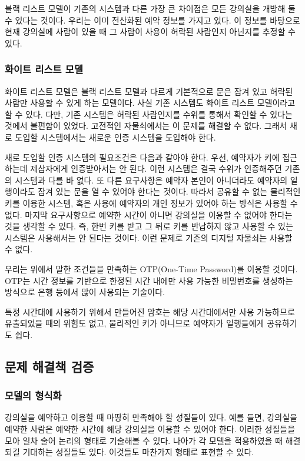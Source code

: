\documentclass[11pt,a4paper]{article}
\begin{document}
블랙 리스트 모델이 기존의 시스템과 다른 가장 큰 차이점은 모든 강의실을 개방해
둘 수 있다는 것이다. 우리는 이미 전산화된 예약 정보를 가지고 있다. 이 정보를
바탕으로 현재 강의실에 사람이 있을 때 그 사람이 사용이 허락된 사람인지 아닌지를
추정할 수 있다.

\subsubsection{화이트 리스트 모델}
화이트 리스트 모델은 블랙 리스트 모델과 다르게 기본적으로 문은 잠겨 있고 허락된
사람만 사용할 수 있게 하는 모델이다. 사실 기존 시스템도 화이트 리스트
모델이라고 할 수 있다. 다만, 기존 시스템은 허락된 사람인지를 수위를 통해서
확인할 수 있다는 것에서 불편함이 있었다. 고전적인 자물쇠에서는 이 문제를 해결할
수 없다. 그래서 새로 도입할 시스템에서는 새로운 인증 시스템을 도입해야 한다.

새로 도입할 인증 시스템의 필요조건은 다음과 같아야 한다. 우선, 예약자가 키에
접근하는데 제삼자에게 인증받아서는 안 된다. 이런 시스템은 결국 수위가
인증해주던 기존의 시스템과 다를 바 없다. 또 다른 요구사항은 예약자 본인이
아니더라도 예약자의 일행이라도 잠겨 있는 문을 열 수 있어야 한다는 것이다.
따라서 공유할 수 없는 물리적인 키를 이용한 시스템, 혹은 사용에 예약자의 개인
정보가 있어야 하는 방식은 사용할 수 없다. 마지막 요구사항으로 예약한 시간이
아니면 강의실을 이용할 수 없어야 한다는 것을 생각할 수 있다. 즉, 한번 키를 받고
그 뒤로 키를 반납하지 않고 사용할 수 있는 시스템은 사용해서는 안 된다는 것이다.
이런 문제로 기존의 디지털 자물쇠는 사용할 수 없다.

우리는 위에서 말한 조건들을 만족하는 OTP(One-Time Password)를 이용할 것이다.
OTP는 시간 정보를 기반으로 한정된 시간 내에만 사용 가능한 비밀번호를 생성하는
방식으로 은행 등에서 많이 사용되는 기술이다.

특정 시간대에 사용하기 위해서 만들어진 암호는 해당 시간대에서만 사용 가능하므로
유출되었을 때의 위험도 없고, 물리적인 키가 아니므로 예약자가 일행들에게
공유하기도 쉽다.

\subsection{문제 해결책 검증}

\subsubsection{모델의 형식화}
강의실을 예약하고 이용할 때 마땅히 만족해야 할 성질들이 있다. 예를 들면,
강의실을 예약한 사람은 예약한 시간에 해당 강의실을 이용할 수 있어야 한다.
이러한 성질들을 모아 일차 술어 논리의 형태로 기술해볼 수 있다. 나아가 각 모델을
적용하였을 때 해결되길 기대하는 성질들도 있다. 이것들도 마찬가지 형태로 표현할
수 있다.
\end{document}
